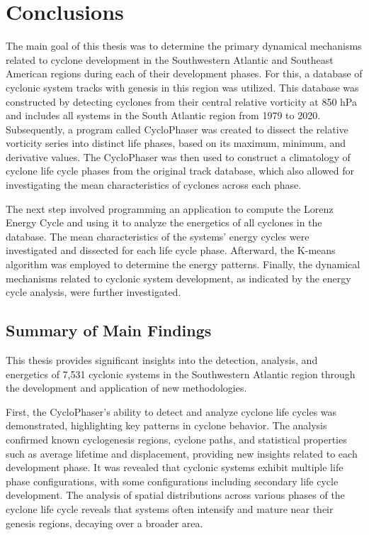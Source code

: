 \chapter{Conclusions}\label{ch:conclusion}

The main goal of this thesis was to determine the primary dynamical mechanisms related to cyclone development in the Southwestern Atlantic and Southeast American regions during each of their development phases. For this, a database of cyclonic system tracks with genesis in this region was utilized. This database was constructed by detecting cyclones from their central relative vorticity at 850 hPa and includes all systems in the South Atlantic region from 1979 to 2020. Subsequently, a program called CycloPhaser was created to dissect the relative vorticity series into distinct life phases, based on its maximum, minimum, and derivative values. The CycloPhaser was then used to construct a climatology of cyclone life cycle phases from the original track database, which also allowed for investigating the mean characteristics of cyclones across each phase.

The next step involved programming an application to compute the Lorenz Energy Cycle and using it to analyze the energetics of all cyclones in the database. The mean characteristics of the systems' energy cycles were investigated and dissected for each life cycle phase. Afterward, the K-means algorithm was employed to determine the energy patterns. Finally, the dynamical mechanisms related to cyclonic system development, as indicated by the energy cycle analysis, were further investigated.

\section{Summary of Main Findings}

This thesis provides significant insights into the detection, analysis, and energetics of 7,531 cyclonic systems in the Southwestern Atlantic region through the development and application of new methodologies.

First, the CycloPhaser's ability to detect and analyze cyclone life cycles was demonstrated, highlighting key patterns in cyclone behavior. The analysis confirmed known cyclogenesis regions, cyclone paths, and statistical properties such as average lifetime and displacement, providing new insights related to each development phase. It was revealed that cyclonic systems exhibit multiple life phase configurations, with some configurations including secondary life cycle development. The analysis of spatial distributions across various phases of the cyclone life cycle reveals that systems often intensify and mature near their genesis regions, decaying over a broader area.

